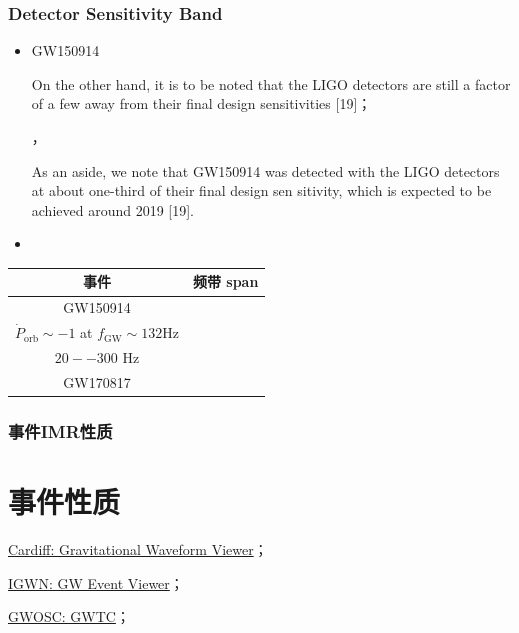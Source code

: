 \documentclass[CJK]{paper}  %
\begin{document}
\subsubsection{Detector Sensitivity Band}
\begin{itemize}
	\item[1. ] GW150914\cite{test_GR_GW150914}
		\par On the other hand, it is to be noted
		 that the LIGO detectors are still a factor of a few away from
		 their final design sensitivities [19]；
		\par \cite{LIGO_enhanced_sensitivity}\cite{AdvLIGO}，
		\par  As an aside, we note that GW150914 was detected with the
			LIGO detectors at about one-third of their final design sen
			sitivity, which is expected to be achieved around 2019 [19].
	\item[] 
\end{itemize}
\begin{table}[h!]
	\begin{center}
		\begin{tabular}{|c|c|}
			\hline
			事件 & 频带 span \\
			\hline
			GW150914 & \makecell{$\dot{P}_\text{orb} \sim -0.1$ at $f_\text{GW} \sim 30 \text{Hz}$\\ $\dot{P}_\text{orb} \sim -1$ at $f_\text{GW} \sim 132 \text{Hz}$\\ $20--300$ Hz\cite{test_GR_GW150914}}\\
			\hline
			GW170817 & \\
			\hline
		\end{tabular}
	\end{center}
\end{table}

\subsubsection{事件IMR性质}


\newpage
\section{事件性质}

\begin{tcolorbox}
	\par \href{https://waveview.cardiffgravity.org/}{Cardiff: Gravitational Waveform Viewer}；
	\par \href{https://peviewer.igwn.org/}{IGWN: GW Event Viewer}；
	\par \href{https://gwosc.org/eventapi/html/GWTC/?page=1&pagesize=100}{GWOSC: GWTC}；
\end{tcolorbox}
\end{document}
